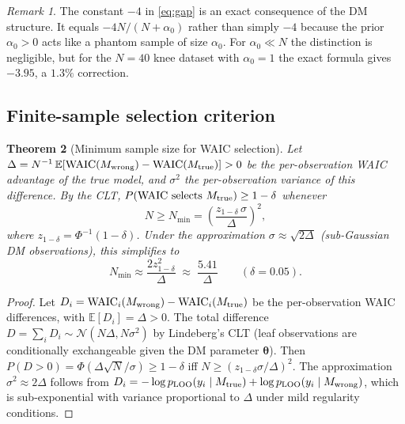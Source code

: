 \documentclass[ba]{imsart}
\theoremstyle{plain}
\newtheorem{theorem}{Theorem}[section]
\theoremstyle{definition}
\theoremstyle{remark}
\newtheorem{remark}[theorem]{Remark}
\newcommand{\waic}{\mathrm{WAIC}}
\newcommand{\Eop}{\mathbb{E}}
\newcommand{\Nmin}{N_{\min}}
\begin{document}
\begin{remark}
The constant $-4$ in \eqref{eq:gap} is an exact consequence of the DM
structure. It equals $-4N/(N+\alpha_0)$ rather than simply $-4$ because the
prior $\alpha_0 > 0$ acts like a phantom sample of size $\alpha_0$.
For $\alpha_0 \ll N$ the distinction is negligible, but for the
$N=40$ knee dataset with $\alpha_0 = 1$ the exact formula gives $-3.95$,
a $1.3\%$ correction.
\end{remark}

\subsection{Finite-sample selection criterion}

\begin{theorem}[Minimum sample size for WAIC selection]\label{thm:Nmin}
  Let $\Delta = N^{-1}\,\Eop[\waic(M_{\rm wrong}) - \waic(M_{\rm true})] > 0$
  be the per-observation WAIC advantage of the true model,
  and $\sigma^2$ the per-observation variance of this difference.
  By the CLT, $P(\text{WAIC selects } M_{\rm true}) \geq 1-\delta$ whenever
  \begin{equation}
    N \geq \Nmin = \left(\frac{z_{1-\delta}\,\sigma}{\Delta}\right)^2,
    \label{eq:Nmin}
  \end{equation}
  where $z_{1-\delta} = \Phi^{-1}(1-\delta)$.
  Under the approximation $\sigma \approx \sqrt{2\Delta}$ (sub-Gaussian
  DM observations), this simplifies to
  \begin{equation}
    \Nmin \approx \frac{2z_{1-\delta}^2}{\Delta}
    \;\approx\; \frac{5.41}{\Delta} \qquad (\delta=0.05).
    \label{eq:Nmin_approx}
  \end{equation}
\end{theorem}

\begin{proof}
  Let $D_i = \waic_i(M_{\rm wrong}) - \waic_i(M_{\rm true})$
  be the per-observation WAIC differences, with $\Eop[D_i]=\Delta>0$.
  The total difference $D = \sum_i D_i \sim \mathcal{N}(N\Delta, N\sigma^2)$
  by Lindeberg's CLT (leaf observations are conditionally exchangeable
  given the DM parameter $\boldsymbol{\theta}$).
  Then $P(D > 0) = \Phi(\Delta\sqrt{N}/\sigma) \geq 1-\delta$
  iff $N \geq (z_{1-\delta}\sigma/\Delta)^2$.
  The approximation $\sigma^2 \approx 2\Delta$ follows from
  $D_i = -\log p_{\rm LOO}(y_i \mid M_{\rm true}) +
  \log p_{\rm LOO}(y_i \mid M_{\rm wrong})$,
  which is sub-exponential with variance proportional to $\Delta$ under mild
  regularity conditions.
\end{proof}
\end{document}
